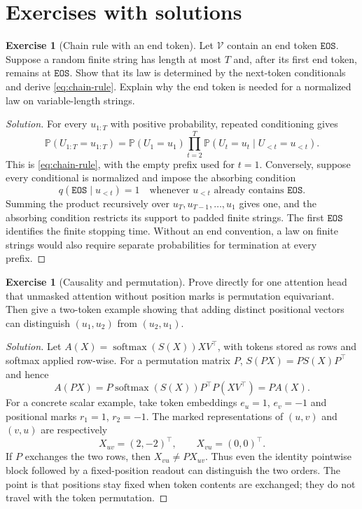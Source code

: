 \documentclass[11pt]{amsart}
\numberwithin{equation}{section}
\theoremstyle{definition}
\newtheorem{exercise}[definition]{Exercise}
\theoremstyle{plain}
\theoremstyle{remark}
\newcommand{\Prob}{\mathbb{P}}
\DeclareMathOperator{\softmax}{softmax}
\begin{document}
\section{Exercises with solutions}
\label{sec:exercises}

\begin{exercise}[Chain rule with an end token]
Let $\mathcal V$ contain an end token $\mathtt{EOS}$.  Suppose a random finite
string has length at most $T$ and, after its first end token, remains at
$\mathtt{EOS}$.  Show that its law is determined by the next-token conditionals
and derive \eqref{eq:chain-rule}.  Explain why the end token is needed for a
normalized law on variable-length strings.
\end{exercise}

\begin{proof}[Solution]
For every $u_{1:T}$ with positive probability, repeated conditioning gives
\[
 \Prob(U_{1:T}=u_{1:T})
 =\Prob(U_1=u_1)
  \prod_{t=2}^T
  \Prob(U_t=u_t\mid U_{<t}=u_{<t}).
\]
This is \eqref{eq:chain-rule}, with the empty prefix used for $t=1$.  Conversely,
suppose every conditional is normalized and impose the absorbing condition
\[
 q(\mathtt{EOS}\mid u_{<t})=1
 \quad\text{whenever $u_{<t}$ already contains $\mathtt{EOS}$.}
\]
Summing the product recursively over $u_T,u_{T-1},\ldots,u_1$ gives one, and
the absorbing condition restricts its support to padded finite strings.  The
first $\mathtt{EOS}$ identifies the finite stopping time.  Without an end
convention, a law on finite strings would also require separate probabilities
for termination at every prefix.
\end{proof}

\begin{exercise}[Causality and permutation]
Prove directly for one attention head that unmasked attention without position
marks is permutation equivariant.  Then give a two-token example showing that
adding distinct positional vectors can distinguish $(u_1,u_2)$ from
$(u_2,u_1)$.
\end{exercise}

\begin{proof}[Solution]
Let $A(X)=\softmax(S(X))XV^\top$, with tokens stored as rows and softmax applied
row-wise.  For a permutation matrix $P$,
$S(PX)=PS(X)P^\top$ and hence
\[
 A(PX)
 =P\softmax(S(X))P^\top P(XV^\top)
 =PA(X).
\]
For a concrete scalar example, take token embeddings $e_u=1$, $e_v=-1$ and
positional marks $r_1=1$, $r_2=-1$.  The marked representations of $(u,v)$
and $(v,u)$ are respectively
\[
 X_{uv}=(2,-2)^\top,
 \qquad
 X_{vu}=(0,0)^\top.
\]
If $P$ exchanges the two rows, then $X_{vu}\ne PX_{uv}$.  Thus even the
identity pointwise block followed by a fixed-position readout can distinguish
the two orders.  The point is that positions stay fixed when token contents
are exchanged; they do not travel with the token permutation.
\end{proof}
\end{document}
